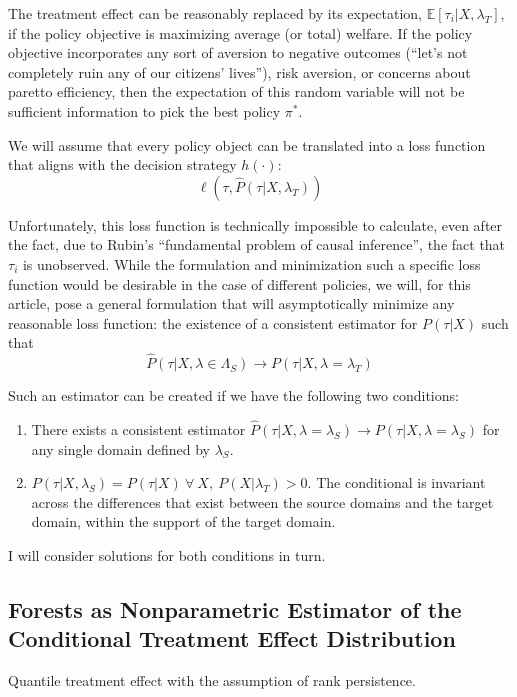 \documentclass[a4paper,12pt]{article}
\begin{document}
The treatment effect can be reasonably replaced by its expectation, $ \mathbb{E} [ \tau_i | X, \lambda_T ] $, if the policy objective is maximizing average (or total) welfare. If the policy objective incorporates any sort of aversion to negative outcomes (``let's not completely ruin any of our citizens' lives''), risk aversion, or concerns about paretto efficiency, then the expectation of this random variable will not be sufficient information to pick the best policy $\pi^*$.

We will assume that every policy object can be translated into a loss function that aligns with the decision strategy $h(\cdot)$:
%
$$
\ell(\tau, \hat{P}(\tau | X, \lambda_T))
$$

Unfortunately, this loss function is technically impossible to calculate, even after the fact, due to Rubin's ``fundamental problem of causal inference'', the fact that $\tau_i$ is unobserved. While the formulation and minimization such a specific loss function would be desirable in the case of different policies, we will, for this article, pose a general formulation that will asymptotically minimize any reasonable loss function: the existence of a consistent estimator for $P(\tau | X)$ such that
%
$$
\hat{P}(\tau | X, \lambda \in \Lambda_S) \rightarrow P(\tau | X, \lambda = \lambda_T)
$$

Such an estimator can be created if we have the following two conditions: 

\begin{enumerate}
\item There exists a consistent estimator $\hat{P}(\tau | X, \lambda = \lambda_S) \rightarrow P(\tau | X, \lambda = \lambda_S)$ for any single domain defined by $\lambda_S$. 
\item $P(\tau | X, \lambda_S) = P(\tau | X) \ \forall \ X, \ P(X | \lambda_T) > 0$. The conditional is invariant across the differences that exist between the source domains and the target domain, within the support of the target domain. 
\end{enumerate}

I will consider solutions for both conditions in turn. 

\subsection*{Forests as Nonparametric Estimator of the Conditional Treatment Effect Distribution}

Quantile treatment effect with the assumption of rank persistence. 
\end{document}
